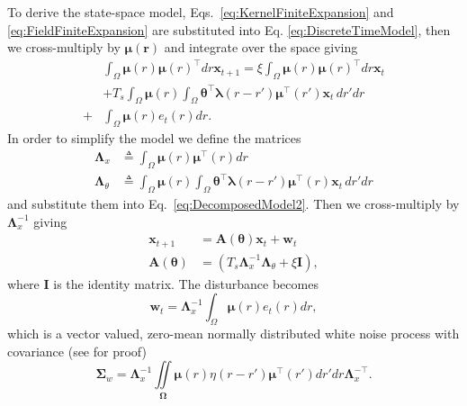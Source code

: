 \documentclass[journal,a4paper]{IEEEtran}
\begin{document}
To derive the state-space model, Eqs.~\eqref{eq:KernelFiniteExpansion} and \eqref{eq:FieldFiniteExpansion} are substituted into Eq. \eqref{eq:DiscreteTimeModel}, then we cross-multiply by $\boldsymbol\mu\left(\mathbf r\right)$ and integrate over the space giving
\begin{align}\label{eq:DecomposedModel2} 
	&\int_{\Omega} \boldsymbol\mu  \left(r\right)\boldsymbol\mu\left(r\right)^\top  dr\mathbf{x}_{t+1}= 
	\xi\int_{\Omega}\boldsymbol\mu\left(r\right)\boldsymbol\mu\left(r\right)^\top dr\mathbf{x}_t \nonumber \\
	&+T_s \int_{\Omega}\boldsymbol\mu\left(r\right) \int_\Omega { 
	   \boldsymbol\theta^\top\boldsymbol\lambda\left(r-r'\right)
	    \boldsymbol\mu^\top\left(r'\right)\mathbf{x}_t 
	\, dr'dr} \nonumber \\
	+& \int_{\Omega}\boldsymbol\mu\left(r\right)e_t\left(r\right)dr.
\end{align}
In order to simplify the model we define the matrices
\begin{align}\label{eq:Lambdax}
 \mathbf{\Lambda}_{x} &\triangleq \int_{\Omega}\boldsymbol\mu\left(r\right)\boldsymbol\mu^\top\left(r\right) dr \\
\label{eq:Lambdatheta}
 \mathbf{\Lambda}_{\theta} &\triangleq \int_{\Omega}\boldsymbol\mu\left(r\right) \int_\Omega { 
	   \boldsymbol\theta^\top\boldsymbol\lambda\left(r-r'\right)
	    \boldsymbol\mu^\top\left(r\right)\mathbf{x}_t 
	\, dr'dr}
\end{align}
and substitute them into Eq.~\eqref{eq:DecomposedModel2}. Then we cross-multiply by $\mathbf{\Lambda}_{x}^{-1}$ giving
\begin{align}\label{eq:StateEquation}
 \mathbf x_{t+1} &=\mathbf A(\boldsymbol \theta) \mathbf x_t+ \mathbf w_t \\
\label{eq:A_theta}
 \mathbf A(\boldsymbol \theta) &= (T_s\mathbf{\Lambda}_{x}^{-1}\mathbf{\Lambda}_{\theta}+\xi\mathbf I),
\end{align}
where $\mathbf I$ is the identity matrix. The disturbance becomes 
\begin{equation}\label{eq:Disturbance}
\mathbf w_t= \mathbf{\Lambda}_{x}^{-1}\int_{\Omega}\boldsymbol\mu \left(r\right)e_t\left(r\right)dr,
\end{equation}
which is a vector valued, zero-mean normally distributed white noise process with covariance (see \cite{Scerri2009} for proof)
\begin{equation}
\boldsymbol\Sigma_w =\mathbf{\Lambda}_{x}^{-1}\iint\limits_{\boldsymbol\Omega}\boldsymbol\mu\left(r\right) \eta\left(r-r'\right)\boldsymbol\mu^{\top}\left(r'\right)dr'dr\mathbf{\Lambda}_{x}^{-\top}.
\end{equation}
\end{document}

